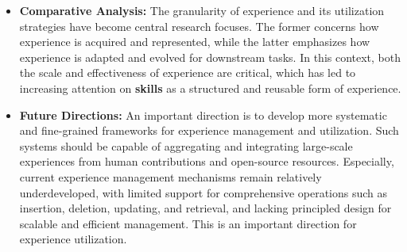 \documentclass{llmxive}
\begin{document}
\begin{tcolorbox}[takeaway,title={Takeaway 6.1}]
\begin{itemize}
\item \textbf{Comparative Analysis:} The granularity of experience and its utilization strategies have become central research focuses. The former concerns how experience is acquired and represented, while the latter emphasizes how experience is adapted and evolved for downstream tasks. 
In this context, both the scale and effectiveness of experience are critical, which has led to increasing attention on \textbf{skills} as a structured and reusable form of experience. 

\item \textbf{Future Directions:} An important direction is to develop more systematic and fine-grained frameworks for experience management and utilization. Such systems should be capable of aggregating and integrating large-scale experiences from human contributions and open-source resources. 
Especially, current experience management mechanisms remain relatively underdeveloped, with limited support for comprehensive operations such as insertion, deletion, updating, and retrieval, and lacking principled design for scalable and efficient management. This is an important direction for experience utilization.
\end{itemize}
\end{tcolorbox}
\end{document}
